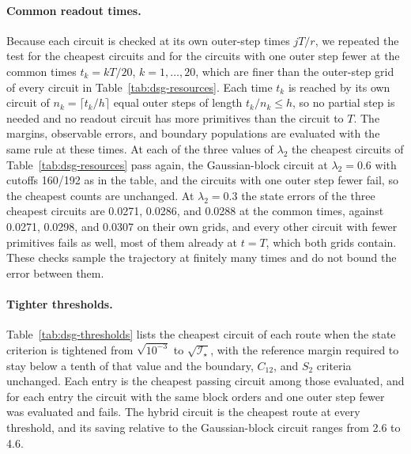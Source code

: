 \documentclass[pra,twocolumn,superscriptaddress,nofootinbib,floatfix]{revtex4-2}
\theoremstyle{remark}
\newcommand{\revcolor}{\color{blue}}
\DeclareRobustCommand{\rev}[1]{{\revcolor #1}}
\begin{document}
\paragraph{\rev{Common readout times.}}
\rev{Because each circuit is checked at its own outer-step times \(jT/r\), we repeated the test for the cheapest circuits and for the circuits with one outer step fewer at the common times \(t_k=kT/20\), \(k=1,\ldots,20\), which are finer than the outer-step grid of every circuit in Table~\ref{tab:dsg-resources}.} \rev{Each time \(t_k\) is reached by its own circuit of \(n_k=\lceil t_k/h\rceil\) equal outer steps of length \(t_k/n_k\le h\), so no partial step is needed and no readout circuit has more primitives than the circuit to \(T\).} \rev{The margins, observable errors, and boundary populations are evaluated with the same rule at these times.} \rev{At each of the three values of \(\lambda_2\) the cheapest circuits of Table~\ref{tab:dsg-resources} pass again, the Gaussian-block circuit at \(\lambda_2=0.6\) with cutoffs 160/192 as in the table, and the circuits with one outer step fewer fail, so the cheapest counts are unchanged.} \rev{At \(\lambda_2=0.3\) the state errors of the three cheapest circuits are 0.0271, 0.0286, and 0.0288 at the common times, against 0.0271, 0.0298, and 0.0307 on their own grids, and every other circuit with fewer primitives fails as well, most of them already at \(t=T\), which both grids contain.} \rev{These checks sample the trajectory at finitely many times and do not bound the error between them.}

\paragraph{\rev{Tighter thresholds.}}
\rev{Table~\ref{tab:dsg-thresholds} lists the cheapest circuit of each route when the state criterion is tightened from \(\sqrt{10^{-3}}\) to \(\sqrt{\mathcal I_\star}\), with the reference margin required to stay below a tenth of that value and the boundary, \(C_{12}\), and \(S_2\) criteria unchanged.} \rev{Each entry is the cheapest passing circuit among those evaluated, and for each entry the circuit with the same block orders and one outer step fewer was evaluated and fails.} \rev{The hybrid circuit is the cheapest route at every threshold, and its saving relative to the Gaussian-block circuit ranges from 2.6 to 4.6.}
\end{document}
